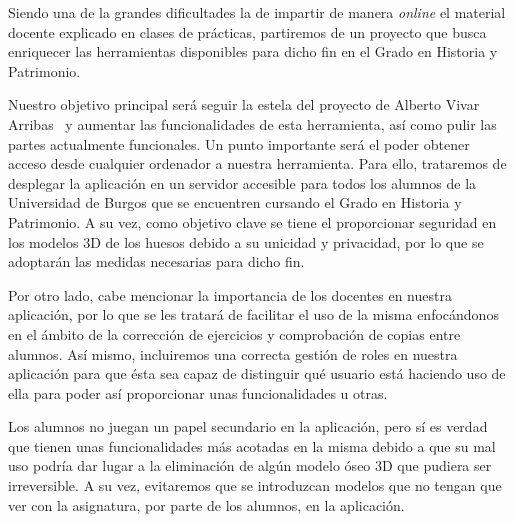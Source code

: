
Siendo una de la grandes dificultades la de impartir de manera \textit{online} el material docente explicado en clases de prácticas, partiremos de un proyecto que busca enriquecer las herramientas disponibles para dicho fin en el Grado en Historia y Patrimonio.

Nuestro objetivo principal será seguir la estela del proyecto de Alberto Vivar Arribas~\cite{github:alberto-viewer} y aumentar las funcionalidades de esta herramienta, así como pulir las partes actualmente funcionales. Un punto importante será el poder obtener acceso desde cualquier ordenador a nuestra herramienta. Para ello, trataremos de desplegar la aplicación en un servidor accesible para todos los alumnos de la Universidad de Burgos que se encuentren cursando el Grado en Historia y Patrimonio. A su vez, como objetivo clave se tiene el proporcionar seguridad en los modelos 3D de los huesos debido a su unicidad y privacidad, por lo que se adoptarán las medidas necesarias para dicho fin.

Por otro lado, cabe mencionar la importancia de los docentes en nuestra aplicación, por lo que se les tratará de facilitar el uso de la misma enfocándonos en el ámbito de la corrección de ejercicios y comprobación de copias entre alumnos. Así mismo, incluiremos una correcta gestión de roles en nuestra aplicación para que ésta sea capaz de distinguir qué usuario está haciendo uso de ella para poder así proporcionar unas funcionalidades u otras.

Los alumnos no juegan un papel secundario en la aplicación, pero sí es verdad que tienen unas funcionalidades más acotadas en la misma debido a que su mal uso podría dar lugar a la eliminación de algún modelo óseo 3D que pudiera ser irreversible. A su vez, evitaremos que se introduzcan modelos que no tengan que ver con la asignatura, por parte de los alumnos, en la aplicación.
